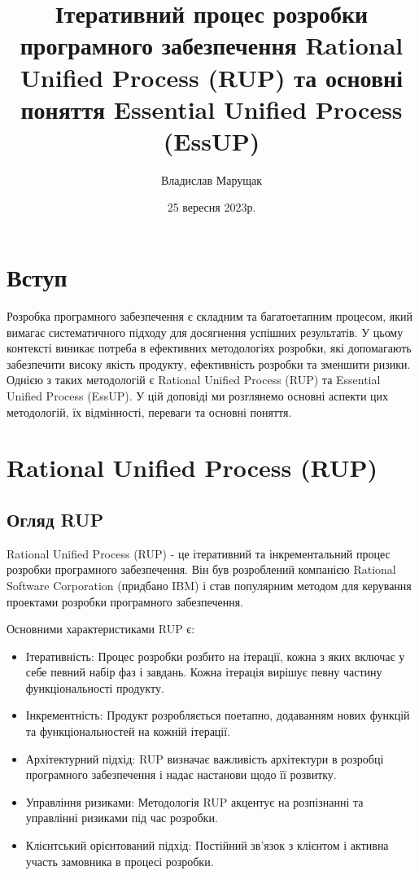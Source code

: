 \documentclass[letterpaper]{report}
\title{Ітеративний процес розробки програмного забезпечення Rational Unified Process (RUP) та основні поняття Essential Unified Process (EssUP)}
\author{Владислав Марущак}
\date{25 вересня 2023р.}
\begin{document}
	\maketitle

	\tableofcontents

	\section*{Вступ}

		Розробка програмного забезпечення є складним та багатоетапним процесом, який вимагає систематичного підходу для досягнення успішних результатів. У цьому контексті виникає потреба в ефективних методологіях розробки, які допомагають забезпечити високу якість продукту, ефективність розробки та зменшити ризики. Однією з таких методологій є Rational Unified Process (RUP) та Essential Unified Process (EssUP). У цій доповіді ми розглянемо основні аспекти цих методологій, їх відмінності, переваги та основні поняття.

	\section{Rational Unified Process (RUP)}

		\subsection{Огляд RUP}

			Rational Unified Process (RUP) - це ітеративний та інкрементальний процес розробки програмного забезпечення. Він був розроблений компанією Rational Software Corporation (придбано IBM) і став популярним методом для керування проектами розробки програмного забезпечення.

			Основними характеристиками RUP є:

		\begin{itemize}
			\item Ітеративність: Процес розробки розбито на ітерації, кожна з яких включає у себе певний набір фаз і завдань. Кожна ітерація вирішує певну частину функціональності продукту.
			\item Інкрементність: Продукт розробляється поетапно, додаванням нових функцій та функціональностей на кожній ітерації.
			\item Архітектурний підхід: RUP визначає важливість архітектури в розробці програмного забезпечення і надає настанови щодо її розвитку.
			\item Управління ризиками: Методологія RUP акцентує на розпізнанні та управлінні ризиками під час розробки.
			\item Клієнтський орієнтований підхід: Постійний зв'язок з клієнтом і активна участь замовника в процесі розробки.
		\end{itemize}
\end{document}
